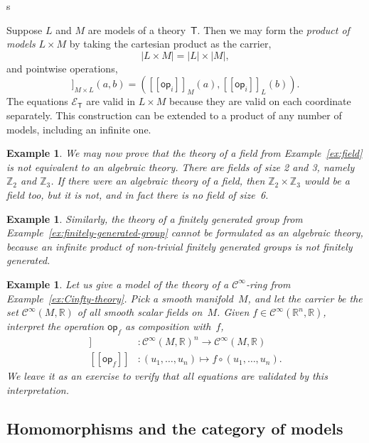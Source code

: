 s\documentclass{amsart}
\newcommand{\RR}{\mathbb{R}} %
\newcommand{\ZZ}{\mathbb{Z}} %
\newcommand{\theory}[1]{\mathsf{#1}} %
\newcommand{\equations}[1]{\mathcal{E}_{\theory{#1}}} %
\newcommand{\carrier}[1]{|#1|} %
\newcommand{\op}[1]{\mathsf{op}_{#1}} %
\newcommand{\Cinfty}{\mathcal{C}^\infty}
\newcommand{\sem}[1]{[\![#1]\!]} %
\newtheorem{example}[definition]{Example}
\begin{document}
Suppose $L$ and $M$ are models of a theory~$\theory{T}$. Then we may form the
\emph{product of models} $L \times M$ by taking the cartesian product as the carrier,
%
\begin{equation*}
  \carrier{L \times M} = \carrier{L} \times \carrier{M},
\end{equation*}
%
and pointwise operations,
%
\begin{equation*}
  \sem{\op{i}}_{M \times L}(a, b) = (\sem{\op{i}}_M(a), \sem{\op{i}}_L(b)).
\end{equation*}
%
The equations $\equations{T}$ are valid in $L \times M$ because they are valid on each
coordinate separately. This construction can be extended to a product of any number of
models, including an infinite one.

\begin{example}
  We may now prove that the theory of a field from Example~\ref{ex:field} is not
  equivalent to an algebraic theory. There are fields of size 2 and 3, namely $\ZZ_2$ and
  $\ZZ_3$. If there were an algebraic theory of a field, then $\ZZ_2 \times \ZZ_3$ would
  be a field too, but it is not, and in fact there is no field of size~6.
\end{example}

\begin{example}
  Similarly, the theory of a finitely generated group from
  Example~\ref{ex:finitely-generated-group} cannot be formulated as an algebraic theory,
  because an infinite product of non-trivial finitely generated groups is not finitely
  generated.
\end{example}

\begin{example}
  Let us give a model of the theory of a $\Cinfty$-ring from
  Example~\ref{ex:Cinfty-theory}. Pick a smooth manifold~$M$, and let the carrier be the
  set $\Cinfty(M, \RR)$ of all smooth scalar fields on~$M$. Given
  $f \in \Cinfty(\RR^n, \RR)$, interpret the operation $\op{f}$ as composition with~$f$,
  \begin{align*}
    \sem{\op{f}} &: \Cinfty(M, \RR)^n \to \Cinfty(M, \RR) \\
    \sem{\op{f}} &: (u_1, \ldots, u_n) \mapsto f \circ (u_1, \ldots, u_n).
  \end{align*}
  We leave it as an exercise to verify that all equations are validated by this
  interpretation.
\end{example}

\subsection{Homomorphisms and the category of models}
\label{sec:homom-categ-models}
\end{document}
